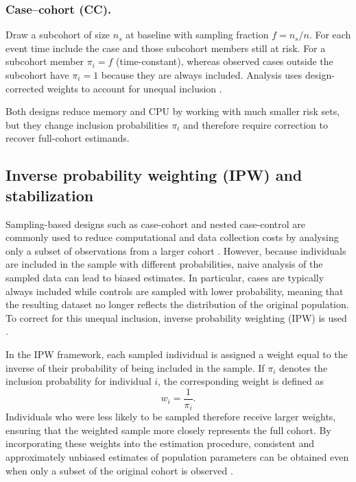 \documentclass[a4paper,twoside,12pt]{report}
\begin{document}
\subsubsection{Case–cohort (CC).} Draw a subcohort of size \(n_s\) at baseline with sampling fraction \(f=n_s/n\). For each event time include the case and those subcohort members still at risk. For a subcohort member \(\pi_i=f\) (time-constant), whereas observed cases outside the subcohort have \(\pi_i=1\) because they are always included. Analysis uses design-corrected weights to account for unequal inclusion \citep{Prentice1986}.

Both designs reduce memory and CPU by working with much smaller risk sets, but they change inclusion probabilities \(\pi_i\) and therefore require correction to recover full-cohort estimands.

\subsection{Inverse probability weighting (IPW) and stabilization}

Sampling-based designs such as case-cohort and nested case-control are commonly used to reduce computational and data collection costs by analysing only a subset of observations from a larger cohort \citep{Prentice1986,Borgan2000}. However, because individuals are included in the sample with different probabilities, naive analysis of the sampled data can lead to biased estimates. In particular, cases are typically always included while controls are sampled with lower probability, meaning that the resulting dataset no longer reflects the distribution of the original population. To correct for this unequal inclusion, inverse probability weighting (IPW) is used \citep{HorvitzThompson1952}.

In the IPW framework, each sampled individual is assigned a weight equal to the inverse of their probability of being included in the sample. If $\pi_i$ denotes the inclusion probability for individual $i$, the corresponding weight is defined as
\[
w_i = \frac{1}{\pi_i}.
\]
Individuals who were less likely to be sampled therefore receive larger weights, ensuring that the weighted sample more closely represents the full cohort. By incorporating these weights into the estimation procedure, consistent and approximately unbiased estimates of population parameters can be obtained even when only a subset of the original cohort is observed \citep{Prentice1986,Borgan2000}.
\end{document}
